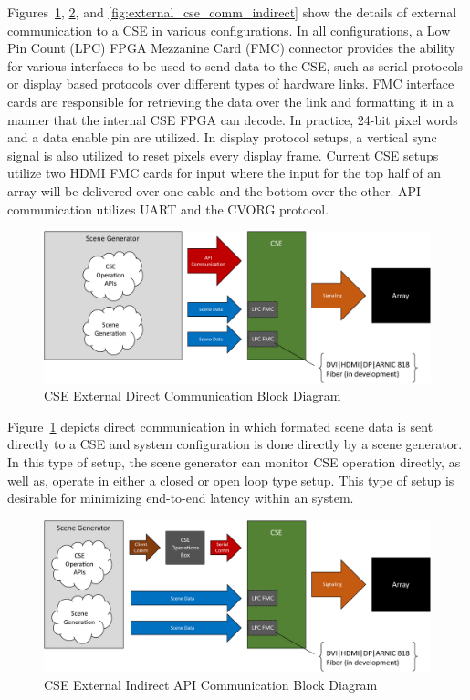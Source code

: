     Figures~\ref{fig:external_cse_comm_direct}, \ref{fig:external_cse_comm_half_indirect}, and \ref{fig:external_cse_comm_indirect} show the details of external communication to a CSE in various configurations. In all configurations, a Low Pin Count (LPC) FPGA Mezzanine Card (FMC) connector provides the ability for various interfaces to be used to send data to the CSE, such as serial protocols or display based protocols over different types of hardware links. FMC interface cards are responsible for retrieving the data over the link and formatting it in a manner that the internal CSE FPGA can decode. In practice, 24-bit pixel words and a data enable pin are utilized. In display protocol setups, a vertical sync signal is also utilized to reset pixels every display frame. Current CSE setups utilize two HDMI FMC cards for input where the input for the top half of an array will be delivered over one cable and the bottom over the other. API communication utilizes UART and the CVORG protocol.

    \begin{figure}
        \centering
        \includegraphics[width=1.0\textwidth]{fig/external_cse_comm_direct.pdf}
        \caption{CSE External Direct Communication Block Diagram}
        \label{fig:external_cse_comm_direct}
    \end{figure}

    Figure~\ref{fig:external_cse_comm_direct} depicts direct communication in which formated scene data is sent directly to a CSE and system configuration is done directly by a scene generator. In this type of setup, the scene generator can monitor CSE operation directly, as well as, operate in either a closed or open loop type setup. This type of setup is desirable for minimizing end-to-end latency within an system.

    \begin{figure}
        \centering
        \includegraphics[width=1.0\textwidth]{fig/external_cse_comm_half_indirect.pdf}
        \caption{CSE External Indirect API Communication Block Diagram}
        \label{fig:external_cse_comm_half_indirect}
    \end{figure}

